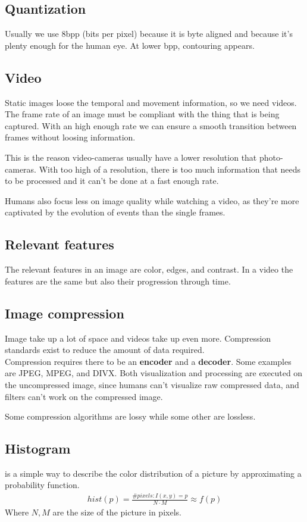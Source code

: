 \documentclass{article}
\begin{document}
\subsection*{Quantization} Usually we use 8bpp (bits per pixel) because it is byte aligned and because it's plenty enough for the human eye. At lower bpp, contouring appears.

\subsection*{Video} Static images loose the temporal and movement information, so we need videos.\\
The frame rate of an image must be compliant with the thing that is being captured. With an high enough rate we can ensure a smooth transition between frames without loosing information.

This is the reason video-cameras usually have a lower resolution that photo-cameras. With too high of a resolution, there is too much information that needs to be processed and it can't be done at a fast enough rate.

Humans also focus less on image quality while watching a video, as they're more captivated by the evolution of events than the single frames.

\subsection*{Relevant features} The relevant features in an image are color, edges, and contrast.
In a video the features are the same but also their progression through time.

\subsection*{Image compression} Image take up a lot of space and videos take up even more. Compression standards exist to reduce the amount of data required.\\
Compression requires there to be an \textbf{encoder} and a \textbf{decoder}. Some examples are JPEG, MPEG, and DIVX.
Both visualization and processing are executed on the uncompressed image, since humans can't visualize raw compressed data, and filters can't work on the compressed image.

Some compression algorithms are lossy while some other are lossless.

\subsection*{Histogram} is a simple way to describe the color distribution of a picture by approximating a probability function.
\begin{align*}
    hist(p) = \frac{\# pixels: I(x,y)=p}{N\cdot M} \approx f(p)
\end{align*}
Where $N,M$ are the size of the picture in pixels.
\end{document}
